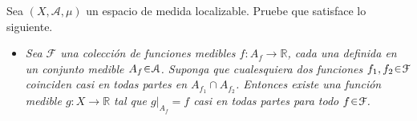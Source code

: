 \setcounter{neje}{58}
\begin{nejer}
Sea $(X, \mathcal{A}, \mu)$ un espacio de medida localizable. Pruebe que satisface lo siguiente.
\begin{itemize}[leftmargin=1.5em]
\item[(F)]\textit{Sea $\mathcal{F}$ una colección de funciones medibles $f \colon A_f \to \mathbb{R}$, cada una definida en un conjunto medible $A_f \en \mathcal{A}$. Suponga que cualesquiera dos funciones $f_1, f_2 \en \mathcal{F}$ coinciden casi en todas partes en $A_{f_1} \cap A_{f_2}$. Entonces existe una función medible $g \colon X \to \mathbb{R}$ tal que $g|_{A_f} = f$ casi en todas partes para todo $f \en \mathcal{F}$.}
\end{itemize}
{
}
\end{nejer}
